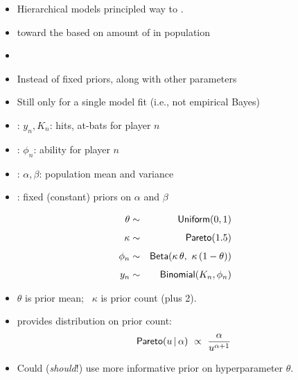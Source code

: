 \documentclass[10pt]{report}
\begin{document}
%
\begin{itemize}
\item Hierarchical models principled way to .
\item {} toward the  based on amount of
 in population
\item {}
\end{itemize}


%
\begin{itemize}
\item Instead of fixed priors,  along with other parameters
\item Still only  for a single model fit (i.e., not empirical Bayes)
\item {}: $y_n, K_n$: hits, at-bats for player $n$
\item {}: $\phi_n$: ability for player $n$
\item {}: $\alpha, \beta$: population mean and variance
\item {}: fixed (constant) priors on $\alpha$ and $\beta$
\end{itemize}


%
\begin{eqnarray*}
\theta &  \sim & \text{\sf Uniform}(0,1)
\\[4pt]
\kappa & \sim & \text{\sf Pareto}(1.5)
\\[4pt]
\phi_n & \sim & \text{\sf Beta}(\kappa \, \theta, \ \kappa \, (1 - \theta))
\\[4pt]
y_n & \sim & \text{\sf Binomial}(K_n, \phi_n)
\end{eqnarray*}
\begin{itemize}
\item $\theta$ is prior mean; \ $\kappa$ is prior count (plus 2). 
\item {} provides  distribution on prior count:
{\small
\[
\text{\sf Pareto}(u \, | \, \alpha)
\ \propto \
\frac{\alpha}
     {u^{\alpha + 1}}
\]
}
\item Could (\emph{should}!) use more informative prior on hyperparameter $\theta$.
\end{itemize}
\end{document}
